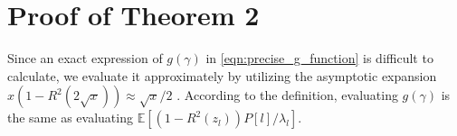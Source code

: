 \documentclass[journal,twocolumn]{IEEEtran}
\theoremstyle{nonumberplain}
\begin{document}
\section{Proof of \textbf{Theorem 2}}
\label{Proof of Theorem 2}
    Since an exact expression of $g(\gamma)$ in \eqref{eqn:precise_g_function} is difficult to calculate, we evaluate it approximately by utilizing the asymptotic expansion $x(1-R^2(2\sqrt{x})) \approx \sqrt{x}/2$ \cite{silverman1972special}. According to the definition, evaluating $g(\gamma)$ is the same as evaluating $\mathbb{E}[(1-R^2(z_l))P[l]/\lambda_l]$. 
\end{document}
